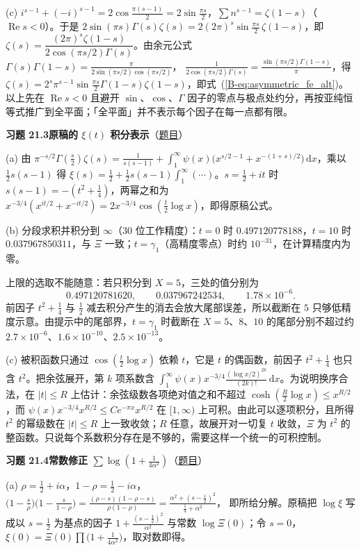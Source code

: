 \documentclass[11pt,a4paper]{article}
\newcommand{\dd}{\,\mathrm{d}}
\renewcommand{\Re}{\operatorname{Re}}
\newcommand{\bref}[1]{\ref*{B-#1}}
\newcommand{\Sol}[2]{%
  \par\addvspace{1.2em}\noindent
  \hypertarget{s:#1}{}\textbf{习题 #1\quad #2}\hfill{\small（\hyperlink{q:#1}{题目}）}\par
  \nopagebreak\smallskip}
\begin{document}
(c) $i^{s-1}+(-i)^{s-1}=2\cos\frac{\pi(s-1)}2=2\sin\frac{\pi s}2$，$\sum n^{s-1}=\zeta(1-s)$（$\Re s<0$）。于是
$2\sin(\pi s)\Gamma(s)\zeta(s)=2(2\pi)^s\sin\frac{\pi s}2\,\zeta(1-s)$，即
$\zeta(s)=\dfrac{(2\pi)^s\zeta(1-s)}{2\cos(\pi s/2)\Gamma(s)}$。由余元公式 $\Gamma(s)\Gamma(1-s)=\frac{\pi}{2\sin(\pi s/2)\cos(\pi s/2)}$，
$\frac1{2\cos(\pi s/2)\Gamma(s)}=\frac{\sin(\pi s/2)\Gamma(1-s)}{\pi}$，得
$\zeta(s)=2^s\pi^{s-1}\sin\frac{\pi s}2\Gamma(1-s)\zeta(1-s)$，即式~(\bref{eq:asymmetric_fe_alt})。以上先在 $\Re s<0$ 且避开 $\sin$、$\cos$、$\Gamma$ 因子的零点与极点处约分，再按亚纯恒等式推广到全平面；「全平面」并不表示每个因子在每一点都有限。

\Sol{21.3}{原稿的 $\xi(t)$ 积分表示}
(a) 由 $\pi^{-s/2}\Gamma(\frac s2)\zeta(s)=\frac1{s(s-1)}+\int_1^\infty\psi(x)\bigl(x^{s/2-1}+x^{-(1+s)/2}\bigr)\dd x$，乘以 $\frac12s(s-1)$ 得 $\xi(s)=\frac12+\frac12s(s-1)\int_1^\infty(\cdots)$。$s=\frac12+it$ 时 $s(s-1)=-(t^2+\frac14)$，两幂之和为 $x^{-3/4}(x^{it/2}+x^{-it/2})=2x^{-3/4}\cos(\frac t2\log x)$，即得原稿公式。

(b) 分段求积并积分到 $\infty$（$30$ 位工作精度）：$t=0$ 时 $0.497120778188$，$t=10$ 时 $0.037967850311$，与 $\Xi$ 一致；$t=\gamma_1$（高精度零点）时约 $10^{-31}$，在计算精度内为零。

上限的选取不能随意：若只积分到 $X=5$，三处的值分别为
\[
  0.497120781620,\qquad 0.037967242534,\qquad 1.78\times10^{-6}.
\]
前因子 $t^2+\frac14$ 与 $\frac12$ 减去积分产生的消去会放大尾部误差，所以截断在 $5$ 只够低精度示意。由提示中的尾部界，$t=\gamma_1$ 时截断在 $X=5$、$8$、$10$ 的尾部分别不超过约 $2.7\times10^{-6}$、$1.6\times10^{-10}$、$2.5\times10^{-13}$。

(c) 被积函数只通过 $\cos(\frac t2\log x)$ 依赖 $t$，它是 $t$ 的偶函数，前因子 $t^2+\frac14$ 也只含 $t^2$。把余弦展开，第 $k$ 项系数含 $\int_1^\infty\psi(x)x^{-3/4}\frac{(\log x/2)^{2k}}{(2k)!}\dd x$。为说明换序合法，在 $|t|\le R$ 上估计：余弦级数各项绝对值之和不超过 $\cosh(\frac R2\log x)\le x^{R/2}$，而 $\psi(x)x^{-3/4}x^{R/2}\le Ce^{-\pi x}x^{R/2}$ 在 $[1,\infty)$ 上可积。由此可以逐项积分，且所得 $t^2$ 的幂级数在 $|t|\le R$ 上一致收敛；$R$ 任意，故展开对一切复 $t$ 收敛，$\Xi$ 为 $t^2$ 的整函数。只说每个系数积分存在是不够的，需要这样一个统一的可积控制。

\Sol{21.4}{常数修正 $\sum\log(1+\frac1{4\alpha^2})$}
(a) $\rho=\frac12+i\alpha$，$1-\rho=\frac12-i\alpha$，
$\bigl(1-\frac s\rho\bigr)\bigl(1-\frac s{1-\rho}\bigr)=\frac{(\rho-s)(1-\rho-s)}{\rho(1-\rho)}=\frac{\alpha^2+(s-\frac12)^2}{\frac14+\alpha^2}$，
即所给分解。原稿把 $\log\xi$ 写成以 $s=\frac12$ 为基点的因子 $1+\frac{(s-\frac12)^2}{\alpha^2}$ 与常数 $\log\Xi(0)$；令 $s=0$，$\xi(0)=\Xi(0)\prod\bigl(1+\frac1{4\alpha^2}\bigr)$，取对数即得。
\end{document}
